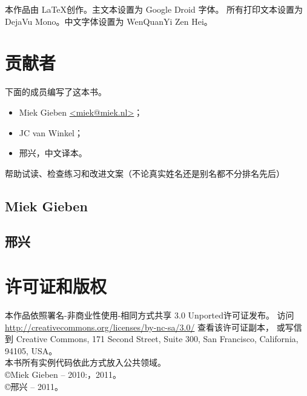 \noindent{}本作品由 \LaTeX 创作。主文本设置为 Google Droid 字体。
所有打印文本设置为 DejaVu Mono。中文字体设置为 WenQuanYi Zen Hei。

\section{贡献者}
下面的成员编写了这本书。
\begin{itemize}
\item{Miek Gieben \qquad\url{<miek@miek.nl>}}；
\item{JC van Winkel}；
\item{邢兴，中文译本}。
\end{itemize}

帮助试读、检查练习和改进文案（不论真实姓名还是别名都不分排名先后）


\subsection{Miek Gieben}


\subsection{邢兴}


\section{许可证和版权}

本作品依照署名-非商业性使用-相同方式共享 3.0 Unported许可证发布。
访问 \url{http://creativecommons.org/licenses/by-nc-sa/3.0/} 查看该许可证副本，
或写信到 Creative Commons, 171 Second Street, Suite 300,
San Francisco, California, 94105, USA。\\
本书所有实例代码依此方式放入公共领域。\\
\copyright Miek Gieben -- 2010:，2011。\\
\copyright 邢兴 -- 2011。
